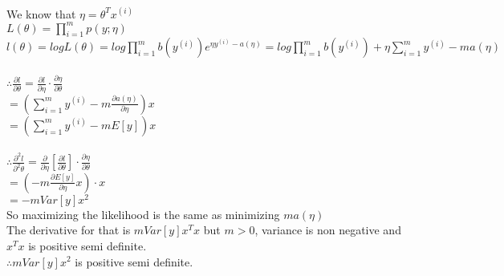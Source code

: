 \begin{answer}\\
We know that $\eta=\theta^T x^{(i)}$\\
$L(\theta)=\prod_{i=1}^{m} p(y;\eta)$\\
$l(\theta)=log L(\theta)=log \prod_{i=1}^{m}b(y^{(i)})e^{\eta y^{(i)}-a(\eta)}=log \prod_{i=1}^{m} b(y^{(i)}) + \eta \sum_{i=1}^{m}y^{(i)} -m a(\eta)$\\\\
$\therefore \frac{\partial l}{\partial \theta}=\frac{\partial l}{\partial \eta}\cdot \frac{\partial \eta}{\partial \theta}$\\
$=(\sum_{i=1}^{m}y^{(i)} - m \frac{\partial a(\eta)}{\partial \eta})x$\\
$=(\sum_{i=1}^{m}y^{(i)} - m E[y])x$\\\\
$\therefore \frac{\partial^2 l}{\partial^2 \theta}=\frac{\partial}{\partial \eta}[\frac{\partial l}{\partial \theta}] \cdot \frac{\partial \eta}{\partial \theta}$\\
$=(-m \frac{\partial E[y]}{\partial \eta}x)\cdot x$\\
$=-m Var[y] x^2$\\
So maximizing the likelihood is the same as minimizing $m a(\eta)$\\
The derivative for that is $m Var[y] x^Tx$ but $m >0$, variance is non negative and $x^Tx$ is positive semi definite.\\
$\therefore m Var[y] x^2$ is positive semi definite.
\end{answer}
